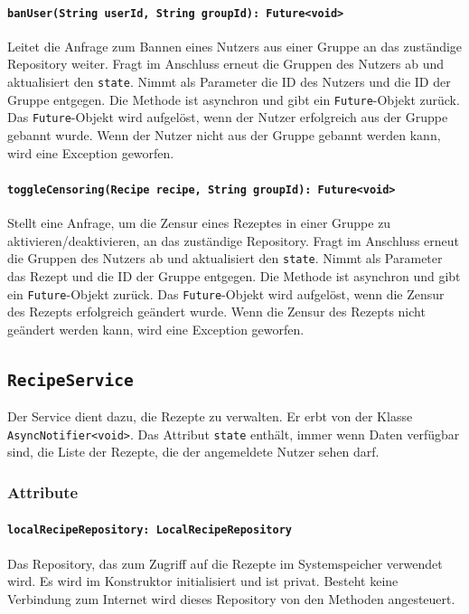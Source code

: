 \documentclass{entwurfsheft}
\begin{document}
\paragraph{\texttt{banUser(String userId, String groupId): Future<void>}}
Leitet die Anfrage zum Bannen eines Nutzers aus einer Gruppe an das zuständige Repository weiter. Fragt im Anschluss erneut die Gruppen des Nutzers ab und aktualisiert den \texttt{state}. Nimmt als Parameter die ID des Nutzers und die ID der Gruppe entgegen. Die Methode ist asynchron und gibt ein \texttt{Future}-Objekt zurück. Das \texttt{Future}-Objekt wird aufgelöst, wenn der Nutzer erfolgreich aus der Gruppe gebannt wurde. Wenn der Nutzer nicht aus der Gruppe gebannt werden kann, wird eine Exception geworfen.
\paragraph{\texttt{toggleCensoring(Recipe recipe, String groupId): Future<void>}}
Stellt eine Anfrage, um die Zensur eines Rezeptes in einer Gruppe zu aktivieren/deaktivieren, an das zuständige Repository. Fragt im Anschluss erneut die Gruppen des Nutzers ab und aktualisiert den \texttt{state}. Nimmt als Parameter das Rezept und die ID der Gruppe entgegen. Die Methode ist asynchron und gibt ein \texttt{Future}-Objekt zurück. Das \texttt{Future}-Objekt wird aufgelöst, wenn die Zensur des Rezepts erfolgreich geändert wurde. Wenn die Zensur des Rezepts nicht geändert werden kann, wird eine Exception geworfen.

\newpage
\subsection{\texttt{RecipeService}}\label{sec:recipeservice}
Der Service dient dazu, die Rezepte zu verwalten. Er erbt von der Klasse \texttt{AsyncNotifier<void>}. Das Attribut \texttt{state} enthält, immer wenn Daten verfügbar sind, die Liste der Rezepte, die der angemeldete Nutzer sehen darf.
\subsubsection*{Attribute}
\paragraph{\texttt{localRecipeRepository: LocalRecipeRepository}}
Das Repository, das zum Zugriff auf die Rezepte im Systemspeicher verwendet wird. Es wird im Konstruktor initialisiert und ist privat. Besteht keine Verbindung zum Internet wird dieses Repository von den Methoden angesteuert.
\end{document}
